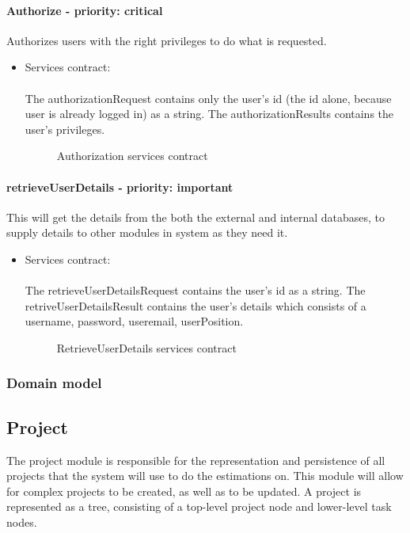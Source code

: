 \paragraph{Authorize - priority: critical}
Authorizes users with the right privileges to do what is requested.
\begin{itemize}
	\item Services contract:\\ \\
	The authorizationRequest contains only the user's id (the id alone, because user is already logged in) as a string. The authorizationResults contains the user's privileges.
	\begin{figure}[H]
    	\centering
    	\caption{Authorization services contract}
    	\label{fig:Authorization_services_contract}
   	\end{figure}
\end{itemize}

\paragraph{retrieveUserDetails - priority: important}
This will get the details from the both the external and internal databases, to supply details to other modules in system as they need it.
\begin{itemize}
	\item Services contract:\\ \\
	The retrieveUserDetailsRequest contains the user's id as a string. The retriveUserDetailsResult contains the user's details which consists of a username, password, useremail, userPosition.
	\begin{figure}[H]
    	\centering
    	\caption{RetrieveUserDetails services contract}
    	\label{fig:RetrieveUserDetails_services_contract}
   	\end{figure}
\end{itemize}

\subsubsection{Domain model}

\subsection{Project}
The project module is responsible for the representation and persistence of all projects that the system will use to do the estimations on. This module will allow for complex projects to be created, as well as to be updated. A project is represented as a tree, consisting of a top-level project node and lower-level task nodes.


